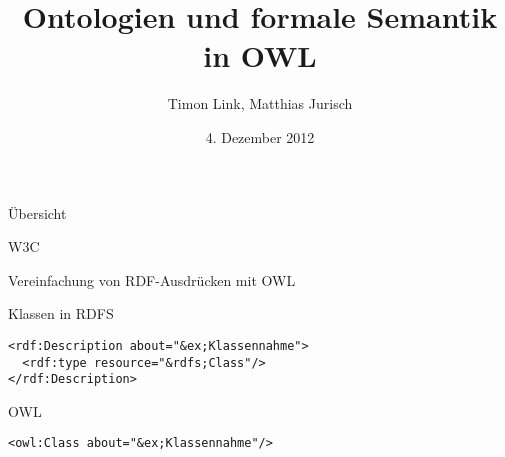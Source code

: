 \documentclass{beamer}
\title[OWL]{Ontologien und formale Semantik in OWL}
\author{Timon Link, Matthias Jurisch}
\date{4. Dezember 2012}
\begin{document}
\begin{frame}
\titlepage
\end{frame}

\begin{frame}{Übersicht}
\end{frame}

\begin{frame}{W3C}
\end{frame}


\begin{frame}[fragile]{Vereinfachung von RDF-Ausdrücken mit
OWL}
\begin{block}{Klassen in RDFS}
\begin{lstlisting}[lang="xml"]
<rdf:Description about="&ex;Klassennahme">
  <rdf:type resource="&rdfs;Class"/>
</rdf:Description>
\end{lstlisting}
\end{block}
\begin{block}{OWL}
\begin{lstlisting}[lang="xml"]
<owl:Class about="&ex;Klassennahme"/>
\end{lstlisting}
\end{block}

\end{frame}





\end{document}
